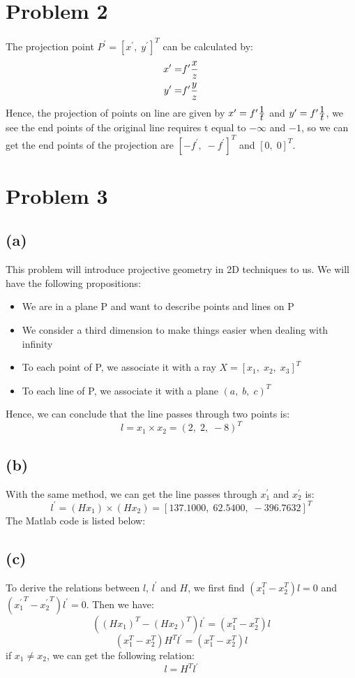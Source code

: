 \documentclass[letterpaper]{article}
\begin{document}
\hspace*{2em}
\section*{Problem 2}
The projection point $P^\prime = [x^\prime,\; y^\prime]^T$ can be calculated by:
\begin{align*}
	x^\prime = & f^\prime \frac{\displaystyle x}{\displaystyle z}\\
	y^\prime = & f^\prime \frac{\displaystyle y}{\displaystyle z}
\end{align*}
Hence, the projection of points on line are given by
$x^\prime = f^\prime \frac{\displaystyle 1}{\displaystyle t}$ and $y^\prime = f^\prime \frac{\displaystyle 1}{\displaystyle t}$, we see the end points of the original line requires t equal to $-\infty$ and $-1$, so we can get the end points of the projection are $[-f^\prime,\; -f^\prime]^T$ and $[0,\; 0]^T$.

\hspace*{2em}
\section*{Problem 3}
\subsection*{(a)}
This problem will introduce projective geometry in 2D techniques to us. We will have the following propositions:
\begin{itemize}
	\item We are in a plane P and want to describe points and lines on P
	\item We consider a third dimension to make things easier when dealing with infinity
	\item To each point of P, we associate it with a ray $X = [x_1,\; x_2,\; x_3]^T$
	\item To each line of P, we associate it with a plane $(a,\; b,\; c)^T$
\end{itemize}
Hence, we can conclude that the line passes through two points is:
$$l = x_1 \times x_2 = (2,\; 2,\; -8)^T$$
\subsection*{(b)}
With the same method, we can get the line passes through $x_1^\prime$ and $x_2^\prime$ is:
$$l^\prime = (Hx_1) \times (Hx_2) = [137.1000,\; 62.5400,\; -396.7632]^T$$
The Matlab code is listed below:

\subsection*{(c)}
To derive the relations between $l$, $l^\prime$ and $H$, we first find $(x_1^T - x_2^T)l = 0$ and $({x_1^\prime}^T - {x_2^\prime}^T)l^\prime = 0$. Then we have:
$$((Hx_1)^T - (Hx_2)^T)l^\prime = (x_1^T - x_2^T)l$$
$$(x_1^T - x_2^T)H^Tl^\prime = (x_1^T - x_2^T)l$$
if $x_1 \neq x_2$, we can get the following relation:
$$l = H^Tl^\prime$$
\end{document}
